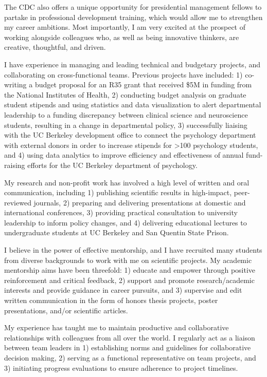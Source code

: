 \documentclass[11pt, a4paper]{maedbh-cv}
\begin{document}
\begin{cvletter}
The CDC also offers a unique opportunity for presidential management fellows to partake in professional development training, which would allow me to strengthen my career ambitions. Most importantly, I am very excited at the prospect of working alongside colleagues who, as well as being innovative thinkers, are creative, thoughtful, and driven.

I have experience in managing and leading technical and budgetary projects, and collaborating on cross-functional teams. Previous projects have included: 1) co-writing a budget proposal for an R35 grant that received \$5M in funding from the National Institutes of Health, 2) conducting budget analysis on graduate student stipends and using statistics and data visualization to alert departmental leadership to a funding discrepancy between clinical science and neuroscience students, resulting in a change in departmental policy, 3) successfully liaising with the UC Berkeley development office to connect the psychology department with external donors in order to increase stipends for >100 psychology students, and 4) using data analytics to improve efficiency and effectiveness of annual fund-raising efforts for the UC Berkeley department of psychology. 

	My research and non-profit work has involved a high level of written and oral communication, including 1) publishing scientific results in high-impact, peer-reviewed journals, 2) preparing and delivering presentations at domestic and international conferences, 3) providing practical consultation to university leadership to inform policy changes, and 4) delivering educational lectures to undergraduate students at UC Berkeley and San Quentin State Prison.

	I believe in the power of effective mentorship, and I have recruited many students from diverse backgrounds to work with me on scientific projects. My academic mentorship aims have been threefold: 1) educate and empower through positive reinforcement and critical feedback, 2) support and promote research/academic interests and provide guidance in career pursuits, and 3) supervise and edit written communication in the form of honors thesis projects, poster presentations, and/or scientific articles. 

	My experience has taught me to maintain productive and collaborative relationships with colleagues from all over the world. I regularly act as a liaison between team leaders in 1) establishing norms and guidelines for collaborative decision making, 2) serving as a functional representative on team projects, and 3) initiating progress evaluations to ensure adherence to project timelines.  


\end{cvletter}
\end{document}
